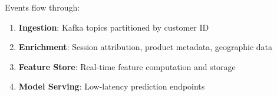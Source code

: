 Events flow through:

\begin{enumerate}
    \item \textbf{Ingestion}: Kafka topics partitioned by customer ID
    \item \textbf{Enrichment}: Session attribution, product metadata, geographic data
    \item \textbf{Feature Store}: Real-time feature computation and storage
    \item \textbf{Model Serving}: Low-latency prediction endpoints
\end{enumerate}

